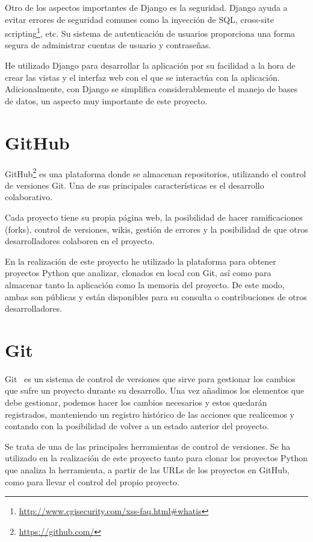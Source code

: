 \documentclass[a4paper, 12pt]{book}
\begin{document}
Otro de los aspectos importantes de Django es la seguridad. Django ayuda a evitar errores de seguridad comunes como la inyección de SQL, cross-site scripting\footnote{\url{http://www.cgisecurity.com/xss-faq.html#whatis}}, etc. Su sistema de autenticación de usuarios proporciona una forma segura de administrar cuentas de usuario y contraseñas.

He utilizado Django para desarrollar la aplicación por su facilidad a la hora de crear las vistas y el interfaz web con el que se interactúa con la aplicación. Adicionalmente, con Django se simplifica considerablemente el manejo de bases de datos, un aspecto muy importante de este proyecto.

\section{GitHub} 
\label{sec:seccion4}
GitHub\footnote{\url{https://github.com/}} es una plataforma donde se almacenan repositorios, utilizando el control de versiones Git. Una de sus principales características es el desarrollo colaborativo. 

Cada proyecto tiene su propia página web, la posibilidad de hacer ramificaciones (forks), control de versiones, wikis, gestión de errores y la posibilidad de que otros desarrolladores colaboren en el proyecto.

En la realización de este proyecto he utilizado la plataforma para obtener proyectos Python que analizar, clonados en local con Git, así como para almacenar tanto la aplicación como la memoria del proyecto. De este modo, ambas son públicas y están disponibles para su consulta o contribuciones de otros desarrolladores.

\section{Git} 
\label{sec:seccion5}
Git~\cite{git:_git} es un sistema de control de versiones que sirve para gestionar los cambios que sufre un proyecto durante su desarrollo. Una vez añadimos los elementos que debe gestionar, podemos hacer los cambios necesarios y estos quedarán registrados, manteniendo un registro histórico de las acciones que realicemos y contando con la posibilidad de volver a un estado anterior del proyecto.

Se trata de una de las principales herramientas de control de versiones. Se ha utilizado en la realización de este proyecto tanto para clonar los proyectos Python que analiza la herramienta, a partir de las URLs de los proyectos en GitHub, como para llevar el control del propio proyecto.
\end{document}
